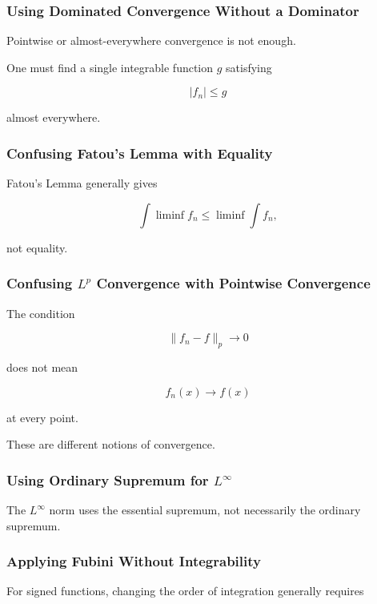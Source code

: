 \subsubsection{Using Dominated Convergence Without a Dominator}

Pointwise or almost-everywhere convergence is not enough.

One must find a single integrable function \(g\) satisfying

\[
|f_n|\leq g
\]

almost everywhere.

\subsubsection{Confusing Fatou's Lemma with Equality}

Fatou's Lemma generally gives

\[
\boxed{
\int\liminf f_n
\leq
\liminf\int f_n,
}
\]

not equality.

\subsubsection{Confusing \(L^p\) Convergence with Pointwise Convergence}

The condition

\[
\|f_n-f\|_p\to0
\]

does not mean

\[
f_n(x)\to f(x)
\]

at every point.

These are different notions of convergence.

\subsubsection{Using Ordinary Supremum for \(L^\infty\)}

The \(L^\infty\) norm uses the essential supremum, not necessarily the
ordinary supremum.

\subsubsection{Applying Fubini Without Integrability}

For signed functions, changing the order of integration generally requires

